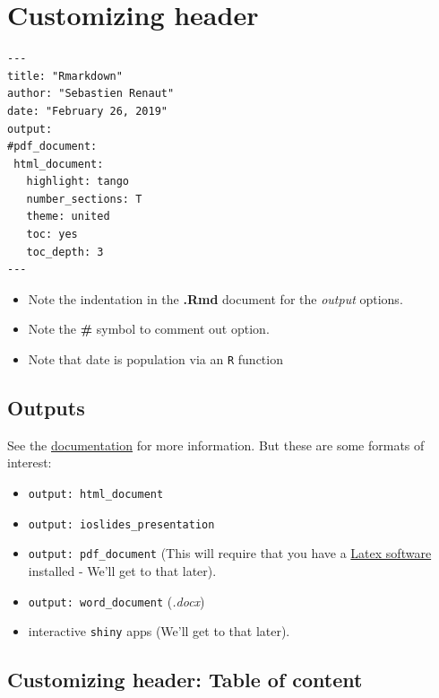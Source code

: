 \documentclass[]{article}
\providecommand{\tightlist}{%
  \setlength{\itemsep}{0pt}\setlength{\parskip}{0pt}}
\begin{document}
\hypertarget{customizing-header}{%
\section{Customizing header}\label{customizing-header}}

\begin{verbatim}
---  
title: "Rmarkdown"  
author: "Sebastien Renaut"  
date: "February 26, 2019"   
output: 
#pdf_document:
 html_document:  
   highlight: tango  
   number_sections: T  
   theme: united 
   toc: yes  
   toc_depth: 3  
---  
\end{verbatim}

\begin{itemize}
\tightlist
\item
  Note the indentation in the \textbf{.Rmd} document for the
  \emph{output} options.
\item
  Note the \textbf{\#} symbol to comment out option.\\
\item
  Note that date is population via an \texttt{R} function
\end{itemize}

\hypertarget{outputs}{%
\subsection{Outputs}\label{outputs}}

See the
\href{https://rmarkdown.rstudio.com/lesson-9.html}{documentation} for
more information. But these are some formats of interest:

\begin{itemize}
\item
  \texttt{output:\ html\_document}
\item
  \texttt{output:\ ioslides\_presentation}
\item
  \texttt{output:\ pdf\_document} (This will require that you have a
  \href{https://www.latex-project.org/get/}{Latex software} installed -
  We'll get to that later).
\item
  \texttt{output:\ word\_document} (\emph{.docx})
\item
  interactive \texttt{shiny} apps (We'll get to that later).
\end{itemize}

\hypertarget{customizing-header-table-of-content}{%
\subsection{Customizing header: Table of
content}\label{customizing-header-table-of-content}}
\end{document}
